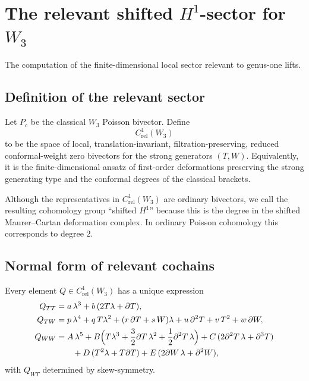 \section{The relevant shifted $H^1$-sector for $W_3$}

The computation of the finite-dimensional local sector relevant to genus-one lifts.

\subsection{Definition of the relevant sector}

\begin{definition}
Let $P_c$ be the classical $W_3$ Poisson bivector. Define
\[
C^1_{\mathrm{rel}}(W_3)
\]
to be the space of local, translation-invariant, filtration-preserving, reduced conformal-weight
zero bivectors for the strong generators $(T,W)$. Equivalently, it is the finite-dimensional
ansatz of first-order deformations preserving the strong generating type and the conformal
degrees of the classical brackets.
\end{definition}

\begin{remark}
Although the representatives in $C^1_{\mathrm{rel}}(W_3)$ are ordinary bivectors, we call
the resulting cohomology group ``shifted $H^1$'' because this is the degree in the shifted
Maurer--Cartan deformation complex. In ordinary Poisson cohomology this corresponds to
degree $2$.
\end{remark}

\subsection{Normal form of relevant cochains}

\begin{proposition}\label{prop:W3normalform}
Every element $Q\in C^1_{\mathrm{rel}}(W_3)$ has a unique expression
\begin{align}
Q_{TT}&=a\,\lambda^3+b\,(2T\lambda+\partial T),\label{eq:QTT}\\
Q_{TW}&=p\,\lambda^4+q\,T\lambda^2+(r\,\partial T+s\,W)\lambda+u\,\partial^2T+v\,T^2+w\,\partial W,\label{eq:QTW}\\
Q_{WW}&=
A\,\lambda^5
+B\Big(T\lambda^3+\frac32\partial T\,\lambda^2+\frac12\partial^2T\,\lambda\Big)
+C\,(2\partial^2T\,\lambda+\partial^3T)\notag\\
&\qquad
+D\,(T^2\lambda+T\partial T)
+E\,(2\partial W\,\lambda+\partial^2W),\label{eq:QWW}
\end{align}
with $Q_{WT}$ determined by skew-symmetry.
\end{proposition}

